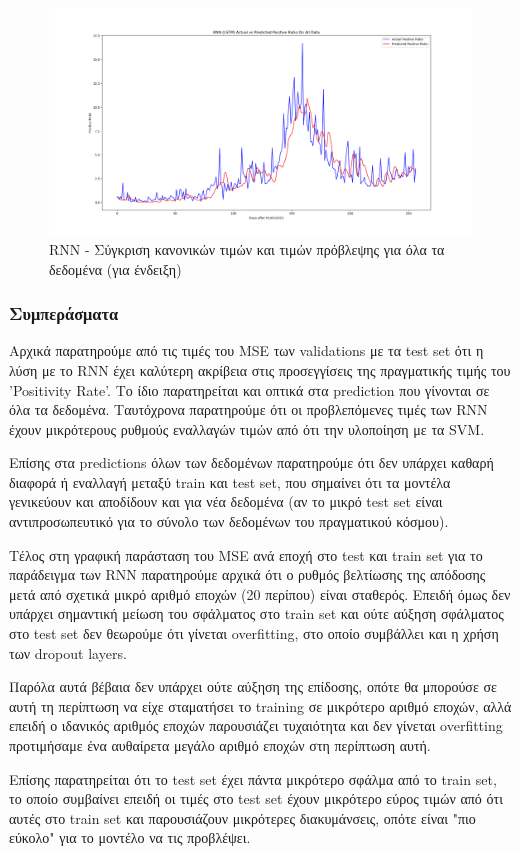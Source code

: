 \documentclass[12pt,a4paper]{article}
\begin{document}
\begin{figure}[H]
	\includegraphics[width=\textwidth]{Figures/Question3/7. SVR Actual vs Predicted All Data.png}
	\caption{RNN - Σύγκριση κανονικών τιμών και τιμών πρόβλεψης για όλα τα δεδομένα (για ένδειξη)}
\end{figure}

\subsubsection{Συμπεράσματα}

Αρχικά παρατηρούμε από τις τιμές του MSE των validations με τα test set ότι η λύση με το RNN έχει καλύτερη ακρίβεια στις προσεγγίσεις της πραγματικής τιμής του 'Positivity Rate'. Το ίδιο παρατηρείται και οπτικά στα prediction που γίνονται σε όλα τα δεδομένα. Ταυτόχρονα παρατηρούμε ότι οι προβλεπόμενες τιμές των RNN έχουν μικρότερους ρυθμούς εναλλαγών τιμών από ότι την υλοποίηση με τα SVM.

Επίσης στα predictions όλων των δεδομένων παρατηρούμε ότι δεν υπάρχει καθαρή διαφορά ή εναλλαγή μεταξύ train και test set, που σημαίνει ότι τα μοντέλα γενικεύουν και αποδίδουν και για νέα δεδομένα (αν το μικρό test set είναι αντιπροσωπευτικό για το σύνολο των δεδομένων του πραγματικού κόσμου).

Τέλος στη γραφική παράσταση του MSE ανά εποχή στο test και train set για το παράδειγμα των RNN παρατηρούμε αρχικά ότι ο ρυθμός βελτίωσης της απόδοσης μετά από σχετικά μικρό αριθμό εποχών (20 περίπου) είναι σταθερός. Επειδή όμως δεν υπάρχει σημαντική μείωση του σφάλματος στο train set και ούτε αύξηση σφάλματος στο test set δεν θεωρούμε ότι γίνεται overfitting, στο οποίο συμβάλλει και η χρήση των dropout layers. 

Παρόλα αυτά βέβαια δεν υπάρχει ούτε αύξηση της επίδοσης, οπότε θα μπορούσε σε αυτή τη περίπτωση να είχε σταματήσει το training σε μικρότερο αριθμό εποχών, αλλά επειδή ο ιδανικός αριθμός εποχών παρουσιάζει τυχαιότητα και δεν γίνεται overfitting προτιμήσαμε ένα αυθαίρετα μεγάλο αριθμό εποχών στη περίπτωση αυτή.

Επίσης παρατηρείται ότι το test set έχει πάντα μικρότερο σφάλμα από το train set, το οποίο συμβαίνει επειδή οι τιμές στο test set έχουν μικρότερο εύρος τιμών από ότι αυτές στο train set και παρουσιάζουν μικρότερες διακυμάνσεις, οπότε είναι "πιο εύκολο" για το μοντέλο να τις προβλέψει.
\end{document}
